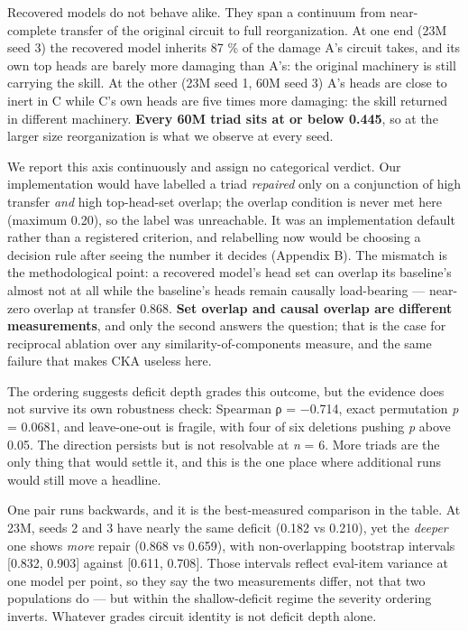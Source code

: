 \documentclass[11pt]{article}
\begin{document}
Recovered models do not behave alike. They span a continuum from near-complete transfer of
the original circuit to full reorganization. At one end (23M seed 3) the recovered model
inherits 87 \% of the damage A's circuit takes, and its own top heads are barely more damaging
than A's: the original machinery is still carrying the skill. At the other (23M seed 1, 60M
seed 3) A's heads are close to inert in C while C's own heads are five times more damaging:
the skill returned in different machinery. \textbf{Every 60M triad sits at or below 0.445}, so at
the larger size reorganization is what we observe at every seed.

We report this axis continuously and assign no categorical verdict. Our implementation would
have labelled a triad \emph{repaired} only on a conjunction of high transfer \emph{and} high
top-head-set overlap; the overlap condition is never met here (maximum 0.20), so the label
was unreachable. It was an implementation default rather than a registered criterion, and
relabelling now would be choosing a decision rule after seeing the number it decides
(Appendix B). The mismatch is the methodological point: a recovered model's head set can
overlap its baseline's almost not at all while the baseline's heads remain causally
load-bearing — near-zero overlap at transfer 0.868. \textbf{Set overlap and causal overlap are
different measurements}, and only the second answers the question; that is the case for
reciprocal ablation over any similarity-of-components measure, and the same failure that
makes CKA useless here.

The ordering suggests deficit depth grades this outcome, but the evidence does not survive
its own robustness check: Spearman ρ = −0.714, exact permutation \emph{p} = 0.0681, and
leave-one-out is fragile, with four of six deletions pushing \emph{p} above 0.05. The direction
persists but is not resolvable at \emph{n} = 6. More triads are the only thing that would settle
it, and this is the one place where additional runs would still move a headline.

One pair runs backwards, and it is the best-measured comparison in the table. At 23M, seeds
2 and 3 have nearly the same deficit (0.182 vs 0.210), yet the \emph{deeper} one shows \emph{more}
repair (0.868 vs 0.659), with non-overlapping bootstrap intervals {[}0.832, 0.903{]} against
{[}0.611, 0.708{]}. Those intervals reflect eval-item variance at one model per point, so they
say the two measurements differ, not that two populations do — but within the shallow-deficit
regime the severity ordering inverts. Whatever grades circuit identity is not deficit depth
alone.
\end{document}
